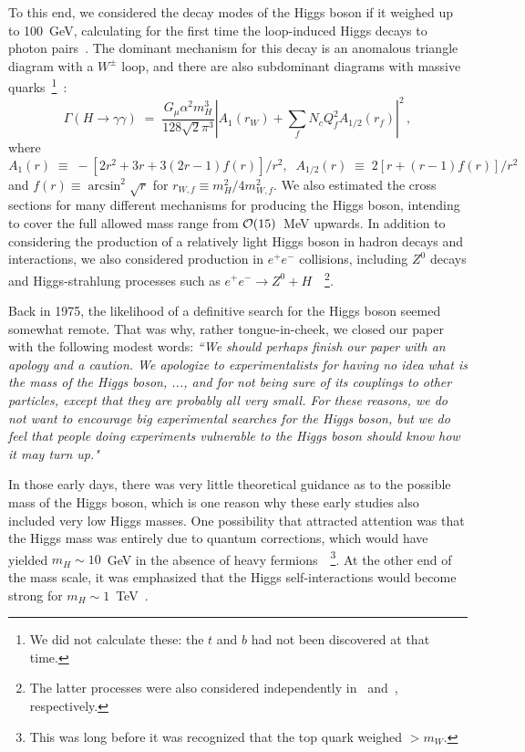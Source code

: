\documentclass[12pt]{article}
\newcommand{\beq}{\begin{equation}}
\newcommand{\eeq}{\end{equation}}
\numberwithin{equation}{section}
\begin{document}
To this end, we considered the decay modes of the Higgs boson if it weighed up to 100~GeV, calculating for
the first time the loop-induced Higgs decays to photon pairs~\cite{EGN}. The dominant mechanism for this decay is an
anomalous triangle diagram with a $W^\pm$ loop, and there are also subdominant diagrams with
massive quarks~\footnote{We did not calculate these: the $t$ and $b$ had not been discovered at that time.}~\cite{Djouadi}:
\beq
\Gamma(H \to \gamma \gamma) \; = \; \frac{G_\mu \alpha^2 m_H^3}{128 \sqrt{2} \pi^3}
\left| A_1 (r_W) + \sum_f N_c Q_f^2 A_{1/2} (r_f)\right|^2 \, ,
\label{Djouadi}
\eeq
where
\beq
A_1(r) \; \equiv \; -\left[2 r^2 + 3 r + 3(2 r - 1)f(r)\right]/r^2, \; \; A_{1/2}(r) \; \equiv\;  2 \left[r + (r - 1) f(r) \right]/r^2
\eeq
and $f (r) \equiv \arcsin^2 \sqrt{r}$ for $r_{W, f} \equiv m_H^2/4m_{W, f}^2$. We also estimated the cross
sections for many different mechanisms for producing the Higgs boson, intending to cover the full allowed mass range
from ${\cal O}(15)$~MeV upwards. In addition to considering the production of a relatively light Higgs boson in
hadron decays and interactions, we also considered production in $e^+ e^-$ collisions, including $Z^0$ decays and Higgs-strahlung 
processes such as $e^+ e^- \to Z^0 + H$~\cite{EGN}~\footnote{The latter processes were also considered
independently in~\cite{Bj} and~\cite{IK}, respectively.}.

Back in 1975, the likelihood of a definitive search for the Higgs boson seemed somewhat remote. That was
why, rather tongue-in-cheek, we closed our paper~\cite{EGN} with the following modest words: {\it ``We should
perhaps finish our paper with an apology and a caution. We apologize to experimentalists for having no idea what is the
mass of the Higgs boson, ..., and for not being sure of its couplings to other particles, except that they are
probably all very small. For these reasons, we do not want to encourage big experimental searches for the Higgs boson,
but we do feel that people doing experiments vulnerable to the Higgs boson should know how it may turn up."}

In those early days, there was very little theoretical guidance as to
the possible mass of the Higgs boson, which is one reason why these
early studies also included very low Higgs masses. One possibility
that attracted attention was that the Higgs mass was entirely due to
quantum corrections, which would have yielded $m_H \sim 10$~GeV in the
absence of heavy fermions~\cite{CW}~\footnote{This was long before it
  was recognized that the top quark weighed $> m_W$.}. At the other
end of the mass scale, it was emphasized that the Higgs
self-interactions would become strong for $m_H \sim
1$~TeV~\cite{heavyH}.
\end{document}
